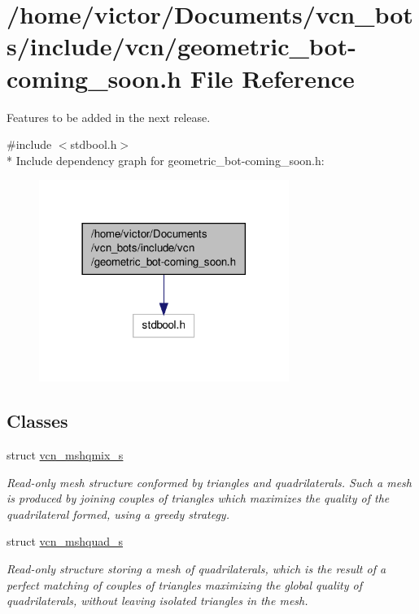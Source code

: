 \hypertarget{geometric__bot-coming__soon_8h}{\section{/home/victor/\+Documents/vcn\+\_\+bots/include/vcn/geometric\+\_\+bot-\/coming\+\_\+soon.h File Reference}
\label{geometric__bot-coming__soon_8h}
}


Features to be added in the next release.  


{\ttfamily \#include $<$stdbool.\+h$>$}\\*
Include dependency graph for geometric\+\_\+bot-\/coming\+\_\+soon.h\+:
\nopagebreak
\begin{figure}[H]
\begin{center}
\leavevmode
\includegraphics[width=230pt]{geometric__bot-coming__soon_8h__incl}
\end{center}
\end{figure}
\subsection*{Classes}
\begin{DoxyCompactItemize}
\item 
struct \hyperlink{structvcn__mshqmix__s}{vcn\+\_\+mshqmix\+\_\+s}
\begin{DoxyCompactList}\small\item\em Read-\/only mesh structure conformed by triangles and quadrilaterals. Such a mesh is produced by joining couples of triangles which maximizes the quality of the quadrilateral formed, using a greedy strategy. \end{DoxyCompactList}\item 
struct \hyperlink{structvcn__mshquad__s}{vcn\+\_\+mshquad\+\_\+s}
\begin{DoxyCompactList}\small\item\em Read-\/only structure storing a mesh of quadrilaterals, which is the result of a perfect matching of couples of triangles maximizing the global quality of quadrilaterals, without leaving isolated triangles in the mesh. \end{DoxyCompactList}\end{DoxyCompactItemize}
